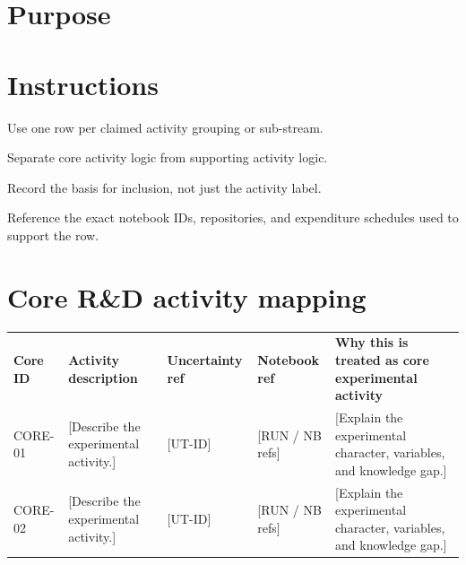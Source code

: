 \documentclass[11pt]{article}
\begin{document}
\RDTitlePage
\tableofcontents
\clearpage

\section{Purpose}

\section{Instructions}
\begin{RDChecklist}
\item Use one row per claimed activity grouping or sub-stream.
\item Separate core activity logic from supporting activity logic.
\item Record the basis for inclusion, not just the activity label.
\item Reference the exact notebook IDs, repositories, and expenditure schedules used to support the row.
\end{RDChecklist}

\section{Core R\&D activity mapping}
\begin{xltabular}{\textwidth}{L{2.1cm}L{3.9cm}L{2.4cm}L{2.4cm}Y}
\textbf{Core ID} & \textbf{Activity description} & \textbf{Uncertainty ref} & \textbf{Notebook ref} & \textbf{Why this is treated as core experimental activity} \\
CORE-01 & {[Describe the experimental activity.]} & {[UT-ID]} & {[RUN / NB refs]} & {[Explain the experimental character, variables, and knowledge gap.]} \\
CORE-02 & {[Describe the experimental activity.]} & {[UT-ID]} & {[RUN / NB refs]} & {[Explain the experimental character, variables, and knowledge gap.]} \\
\end{xltabular}
\end{document}

